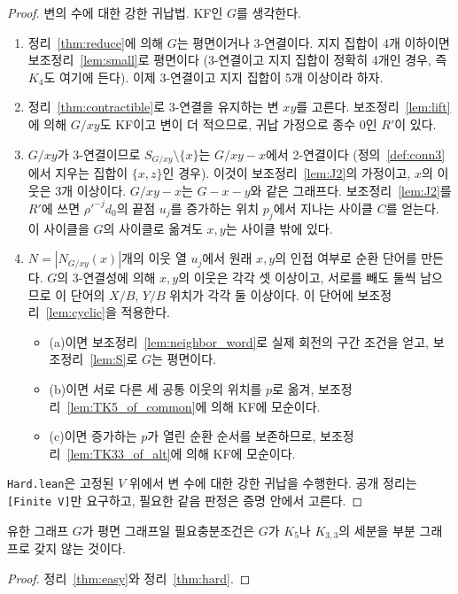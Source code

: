 \begin{proof}
\leanok
변의 수에 대한 강한 귀납법. KF인 \(G\)를 생각한다.
\begin{enumerate}
  \item 정리~\ref{thm:reduce}에 의해 \(G\)는 평면이거나 3-연결이다. 지지 집합이 4개 이하이면
        보조정리~\ref{lem:small}로 평면이다 (3-연결이고 지지 집합이 정확히 4개인 경우, 즉 \(K_4\)도 여기에
        든다). 이제 3-연결이고 지지 집합이 5개 이상이라 하자.
  \item 정리~\ref{thm:contractible}로 3-연결을 유지하는 변 \(xy\)를 고른다. 보조정리~\ref{lem:lift}에 의해
        \(G/xy\)도 KF이고 변이 더 적으므로, 귀납 가정으로 종수 0인 \(R'\)이 있다.
  \item \(G/xy\)가 3-연결이므로 \(S_{G/xy} \setminus \{x\}\)는 \(G/xy - x\)에서 2-연결이다 (정의~\ref{def:conn3}에서
        지우는 집합이 \(\{x, z\}\)인 경우). 이것이 보조정리~\ref{lem:J2}의 가정이고, \(x\)의 이웃은 3개 이상이다.
        \(G/xy - x\)는 \(G - x - y\)와 같은 그래프다. 보조정리~\ref{lem:J2}를 \(R'\)에 쓰면
        \(\rho'^{-j}d_0\)의 끝점 \(u_j\)를 증가하는 위치 \(p_j\)에서 지나는 사이클 \(C\)를 얻는다.
        이 사이클을 \(G\)의 사이클로 옮겨도 \(x,y\)는 사이클 밖에 있다.
  \item \(N=|N_{G/xy}(x)|\)개의 이웃 열 \(u_j\)에서 원래 \(x,y\)의 인접 여부로 순환 단어를 만든다.
        \(G\)의 3-연결성에 의해 \(x,y\)의 이웃은 각각 셋 이상이고, 서로를 빼도 둘씩 남으므로
        이 단어의 \(X/B\), \(Y/B\) 위치가 각각 둘 이상이다. 이 단어에 보조정리~\ref{lem:cyclic}을 적용한다.
    \begin{itemize}
      \item (a)이면 보조정리~\ref{lem:neighbor_word}로 실제 회전의 구간 조건을 얻고,
            보조정리~\ref{lem:S}로 \(G\)는 평면이다.
      \item (b)이면 서로 다른 세 공통 이웃의 위치를 \(p\)로 옮겨,
            보조정리~\ref{lem:TK5_of_common}에 의해 KF에 모순이다.
      \item (c)이면 증가하는 \(p\)가 열린 순환 순서를 보존하므로,
            보조정리~\ref{lem:TK33_of_alt}에 의해 KF에 모순이다.
    \end{itemize}
\end{enumerate}
\texttt{Hard.lean}은 고정된 \(V\) 위에서 변 수에 대한 강한 귀납을 수행한다.
공개 정리는 \texttt{[Finite V]}만 요구하고, 필요한 같음 판정은 증명 안에서 고른다.
\end{proof}

\begin{theorem}[쿠라토프스키 정리]
\label{thm:kuratowski}
\leanok
유한 그래프 \(G\)가 평면 그래프일 필요충분조건은 \(G\)가 \(K_5\)나 \(K_{3,3}\)의 세분을 부분 그래프로 갖지
않는 것이다.
\end{theorem}

\begin{proof}
\leanok
정리~\ref{thm:easy}와 정리~\ref{thm:hard}.
\end{proof}
